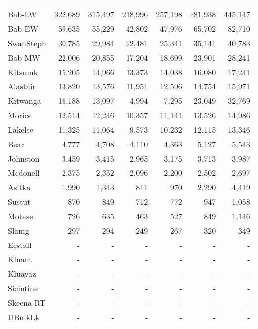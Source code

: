 \documentclass[french,11pt]{book}
\begin{document}
\begin{longtable}[t]{lrrrrrr}
\midrule\\ Bab-LW & 322,689 & 315,497 & 218,996 & 257,198 & 381,938 & 445,147\\ Bab-EW & 59,635 & 55,229 & 42,802 & 47,976 & 65,702 & 82,710\\ SwanSteph & 30,785 & 29,984 & 22,481 & 25,341 & 35,141 & 40,783\\ Bab-MW & 22,006 & 20,855 & 17,204 & 18,699 & 23,901 & 28,241\\ Kitsumk & 15,205 & 14,966 & 13,373 & 14,038 & 16,080 & 17,241\\ Alastair & 13,820 & 13,576 & 11,951 & 12,596 & 14,754 & 15,971\\ Kitwanga & 16,188 & 13,097 & 4,994 & 7,295 & 23,049 & 32,769\\ Morice & 12,514 & 12,246 & 10,357 & 11,141 & 13,526 & 14,986\\ Lakelse & 11,325 & 11,064 & 9,573 & 10,232 & 12,115 & 13,346\\ Bear & 4,777 & 4,708 & 4,110 & 4,363 & 5,127 & 5,543\\ Johnston & 3,459 & 3,415 & 2,965 & 3,175 & 3,713 & 3,987\\ Mcdonell & 2,375 & 2,352 & 2,096 & 2,200 & 2,502 & 2,697\\ Asitka & 1,990 & 1,343 & 811 & 970 & 2,290 & 4,419\\ Sustut & 870 & 849 & 712 & 772 & 947 & 1,058\\ Motase & 726 & 635 & 463 & 527 & 849 & 1,146\\ Slamg & 297 & 294 & 249 & 267 & 320 & 349\\ Ecstall & - & - & - & - & - & -\\ Kluant & - & - & - & - & - & -\\ Kluayaz & - & - & - & - & - & -\\ Sicintine & - & - & - & - & - & -\\ Skeena RT & - & - & - & - & - & -\\ UBulkLk & - & - & - & - & - & -\\* \end{longtable}

\endgroup{} \endgroup{}

\clearpage
\end{document}
